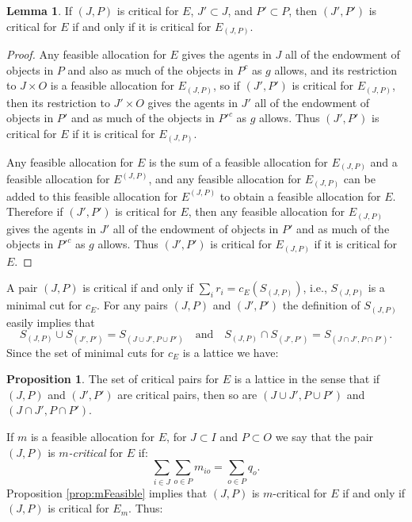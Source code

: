 \documentclass[12pt]{article}
\theoremstyle{definition}
\newtheorem{prop}{Proposition}
\newtheorem{lem}{Lemma}
\begin{document}
\begin{lem} \label{lemma:MinimalSimple} 
  If $(J,P)$ is critical for $E$, $J' \subset J$, and $P' \subset P$, then $(J',P')$ is critical for $E$ if and only if it is critical for $E_{(J,P)}$.
\end{lem}

\begin{proof}
  Any feasible allocation for $E$  gives the agents in $J$ all of the endowment of objects in $P$ and also as much of the objects in $P^c$ as $g$ allows, and its restriction to $J \times O$ is a feasible allocation for $E_{(J,P)}$, so if $(J',P')$ is critical for $E_{(J,P)}$, then its restriction to $J' \times O$ gives the agents in $J'$ all of the endowment of objects in $P'$ and as much of the objects in ${P'}^c$ as $g$ allows.  Thus $(J',P')$ is critical for $E$ if it is critical for $E_{(J,P)}$.
  
  Any feasible allocation for $E$ is the sum of a feasible allocation for $E_{(J,P)}$ and a feasible allocation for $E^{(J,P)}$, and any feasible allocation for $E_{(J,P)}$ can be added to this feasible allocation for $E^{(J,P)}$ to obtain a feasible allocation for $E$.  Therefore if $(J',P')$ is critical for $E$, then any feasible allocation for $E_{(J,P)}$  gives the agents in $J'$ all of the endowment of objects in $P'$ and as much of the objects in ${P'}^c$ as $g$ allows.  Thus $(J',P')$ is critical for $E_{(J,P)}$ if it is critical for $E$.
\end{proof}

A pair $(J,P)$ is critical if and only if $\sum_i r_i = c_E(S_{(J,P)})$, i.e., $S_{(J,P)}$ is a minimal cut for $c_E$.  For any pairs $(J,P)$ and $(J',P')$ the definition of $S_{(J,P)}$ easily implies that $$S_{(J,P)} \cup S_{(J',P')} = S_{(J \cup J',P \cup P')} \quad \text{and} \quad S_{(J,P)} \cap S_{(J',P')} = S_{(J \cap J',P \cap P')}.$$ 
Since the set of minimal cuts for $c_E$ is a lattice we have:

\begin{prop}
The set of critical pairs for $E$ is a lattice in the sense that if  $(J,P)$ and $(J',P')$
are critical pairs, then so are $(J \cup J',P \cup P')$ and $(J \cap J',P \cap P')$.  
\end{prop}

If $m$ is a feasible allocation for $E$, for $J \subset I$ and $P \subset O$ we say that the pair $(J,P)$ is \emph{$m$-critical} for $E$ if:
$$\sum_{i \in J} \sum_{o \in P} m_{io} = \sum_{o \in P} q_o.$$ Proposition \ref{prop:mFeasible} implies that $(J,P)$ is $m$-critical for $E$ if and only if $(J,P)$ is critical for $E_m$.  Thus:
\end{document}
